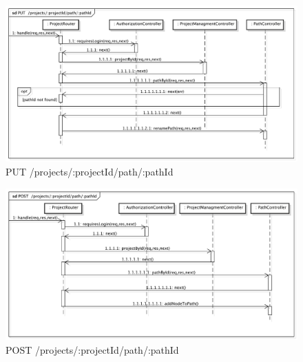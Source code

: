 \label{putPath}
\begin{center}
\begin{figure}[h]
\centering
\includegraphics[scale=0.35,keepaspectratio]{diagrammi/sequenza/BackEnd/putPath.pdf}
\caption{PUT  /projects/:projectId/path/:pathId}
\end{figure}
\FloatBarrier
\end{center}
\label{postPath}
\begin{center}
\begin{figure}[h]
\centering
\includegraphics[scale=0.35,keepaspectratio]{diagrammi/sequenza/BackEnd/postPath.pdf}
\caption{POST  /projects/:projectId/path/:pathId}
\end{figure}
\FloatBarrier
\end{center}
\label{getPremi}
